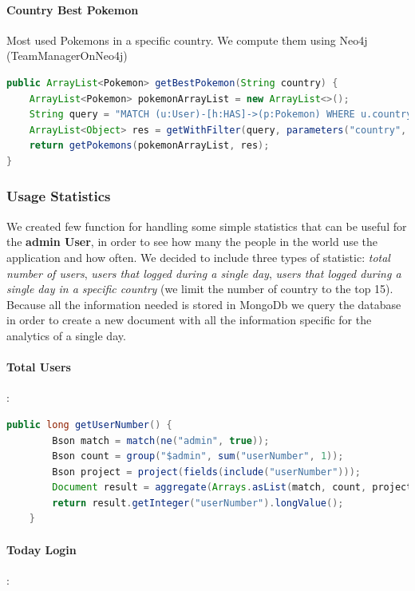 \paragraph{Country Best Pokemon}
Most used Pokemons in a specific country. We compute them using Neo4j (TeamManagerOnNeo4j)

\begin{lstlisting}[language=Java]
public ArrayList<Pokemon> getBestPokemon(String country) {
	ArrayList<Pokemon> pokemonArrayList = new ArrayList<>();
	String query = "MATCH (u:User)-[h:HAS]->(p:Pokemon) WHERE u.country = $country return p.name, count(h) AS held, p.sprite ORDER BY held DESC LIMIT " + ConfigDataHandler.getInstance().configData.numRowsRanking;
	ArrayList<Object> res = getWithFilter(query, parameters("country", country));
	return getPokemons(pokemonArrayList, res);
}
\end{lstlisting}

\subsubsection{Usage Statistics}
We created few function for handling some simple statistics that can be useful for the \textbf{admin User}, in order to see how many the people in the world use the application and how often. We decided to include three types of statistic: \textit{total number of users}, \textit{users that logged during a single day}, \textit{users that logged during a single day in a specific country} (we limit the number of country to the top 15). Because all the information needed is stored in MongoDb we query the database in order to create a new document with all the information specific for the analytics of a single day.

\paragraph{Total Users}:
\begin{lstlisting}[language=Java]
	public long getUserNumber() {
		Bson match = match(ne("admin", true));
		Bson count = group("$admin", sum("userNumber", 1));
		Bson project = project(fields(include("userNumber")));
		Document result = aggregate(Arrays.asList(match, count, project)).get(0);
		return result.getInteger("userNumber").longValue();
	}
\end{lstlisting}
\paragraph{Today Login}:

